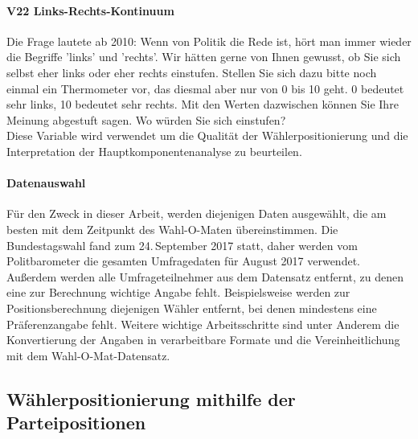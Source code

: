 \paragraph{V22 Links-Rechts-Kontinuum}
Die Frage lautete ab 2010: \glqq Wenn von Politik die Rede ist, hört man immer wieder die Begriﬀe 'links' und 'rechts'. Wir hätten gerne von Ihnen gewusst, ob Sie sich selbst eher links oder eher rechts einstufen. Stellen Sie sich	dazu bitte noch einmal ein Thermometer vor, das diesmal aber nur von 0 bis 10 geht. 0 bedeutet sehr links, 10 bedeutet sehr rechts. Mit den Werten dazwischen können Sie Ihre Meinung abgestuft sagen. Wo würden Sie sich einstufen?\grqq \citep[Variablendokumentation, S.\,61-62]{politbarometer}\\
Diese Variable wird verwendet um die Qualität der Wählerpositionierung  und die Interpretation der Hauptkomponentenanalyse zu beurteilen.

\paragraph{Datenauswahl}
Für den Zweck in dieser Arbeit, werden diejenigen Daten ausgewählt, die am besten mit dem Zeitpunkt des Wahl-O-Maten übereinstimmen.
Die Bundestagswahl fand zum 24.\,September 2017 statt, daher werden vom Politbarometer die gesamten Umfragedaten für August 2017 verwendet.
Außerdem werden alle Umfrageteilnehmer aus dem Datensatz entfernt, zu denen eine zur Berechnung wichtige Angabe fehlt.
Beispielsweise werden zur Positionsberechnung diejenigen Wähler entfernt, bei denen mindestens eine Präferenzangabe fehlt.
Weitere wichtige Arbeitsschritte sind unter Anderem die Konvertierung der Angaben in verarbeitbare Formate und die Vereinheitlichung mit dem Wahl-O-Mat-Datensatz.

\subsection{Wählerpositionierung mithilfe der Parteipositionen}

